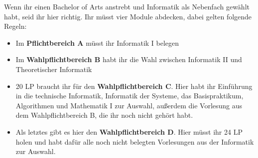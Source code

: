 
Wenn ihr einen Bachelor of Arts anstrebt und Informatik als Nebenfach gewählt habt, seid ihr hier richtig. Ihr müsst vier Module abdecken, dabei gelten folgende Regeln:

\begin{itemize}

	\item Im \textbf{Pflichtbereich A} müsst ihr Informatik I belegen
	\item Im \textbf{Wahlpflichtbereich B} habt ihr die Wahl zwischen Informatik II und Theoretischer Informatik
	\item 20 LP braucht ihr für den \textbf{Wahlpflichtbereich C}. Hier habt ihr Einführung in die technische Informatik, Informatik der Systeme, das Basispraktikum, Algorithmen und Mathematik I zur Auswahl, außerdem die Vorlesung aus dem Wahlpflichtbereich B, die ihr noch nicht gehört habt.
	\item Als letztes gibt es hier den \textbf{Wahlpflichtbereich D}. Hier müsst ihr 24 LP holen und
	habt dafür alle noch nicht belegten Vorlesungen aus der Informatik zur Auswahl.
\end{itemize}
